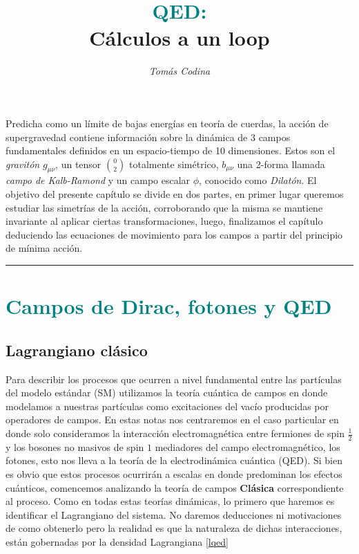 \documentclass[tickz]{article}
\title{\vspace{-35pt}\huge{\textbf{\textcolor{teal}{QED:}}} \\ \vspace{0.1cm} \large{\textbf{Cálculos a un loop}}}
\date{\vspace{-20pt}}
\author{\textit{Tomás Codina}}
\numberwithin{equation}{section}
\begin{document}
\maketitle
\thispagestyle{fancy}






Predicha como un límite de bajas energías en teoría de cuerdas, la acción de supergravedad contiene información sobre la dinámica de 3 campos fundamentales definidos en un espacio-tiempo de 10 dimensiones. Estos son el \textit{gravitón} $ g_{\mu\nu} $, un tensor $ \binom{0}{2} $ totalmente simétrico, $ b_{\mu\nu} $ una 2-forma llamada \textit{campo de Kalb-Ramond} y un campo escalar $ \phi $, conocido como \textit{Dilatón}. El objetivo del presente capítulo se divide en dos partes, en primer lugar queremos estudiar las simetrías de la acción, corroborando que la misma se mantiene invariante al aplicar ciertas transformaciones, luego, finalizamos el capítulo deduciendo las ecuaciones de movimiento para los campos a partir del principio de mínima acción.  

\rule{\textwidth}{0.4pt}


\section{\textcolor{teal}{Campos de Dirac, fotones y QED}}\label{sim}
	
\subsection{Lagrangiano clásico}
Para describir los procesos que ocurren a nivel fundamental entre las
partículas del modelo estándar (SM) utilizamos la teoría cuántica de campos
en donde modelamos a nuestras partículas como excitaciones del vacío
producidas por operadores de campos. En estas notas nos centraremos en el caso particular en donde solo consideramos la interacción electromagnética entre fermiones de spin $ \frac{1}{2} $ y los bosones no masivos de spin $ 1 $ mediadores del campo electromagnético, los fotones, esto nos lleva a la teoría de la electrodinámica cuántica (QED). Si bien es obvio que estos procesos ocurrirán a escalas en donde predominan los efectos cuánticos, comencemos analizando la teoría de campos \textbf{Clásica} correspondiente al proceso. Como en todas estas teorías dinámicas, lo primero que haremos es identificar el Lagrangiano del sistema. No daremos deducciones ni motivaciones de como obtenerlo pero la realidad es que la naturaleza de dichas interacciones, están gobernadas por la densidad Lagrangiana \ref{lqed}
\end{document}
